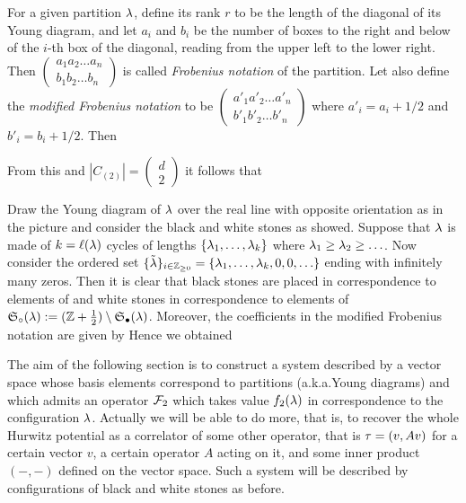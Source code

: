 \documentclass[../main/main.tex]{subfiles}
\begin{document}
For a given partition $\lambda$, define its rank $r$ to be the length of the diagonal of its Young diagram, and let $a_i$ and $b_i$ be the number of boxes to the right and below of the $i$-th box of the diagonal, reading from the upper left to the lower right. Then $\begin{pmatrix}a_1a_2\ldots a_n\\b_1b_2\ldots b_n\end{pmatrix}$ is called \emph{Frobenius notation} of the partition.  Let also define the \emph{modified Frobenius notation} to be $\begin{pmatrix}a'_1a'_2\ldots a'_n\\b'_1b'_2\ldots b'_n\end{pmatrix}$ where $a'_i=a_i+1/2$ and $b'_i=b_i+1/2$. Then
	
\begin{lemma}[{\cite[Ex. 4.17(c)]{FH}}]
\end{lemma}

From this and $|C_{(2)}|=\begin{pmatrix}d\\2\end{pmatrix}$ it follows that 

Draw the Young diagram of $\lambda$ over the real line with opposite orientation as in the picture  and consider the black and white stones as showed. Suppose that $\lambda$ is made of $k=\ell(\lambda)$ cycles of lengths $\{\lambda_1,\ldots,\lambda_k\}$ where $\lambda_1\geq\lambda_2\geq\ldots$. Now consider the ordered set $\{\tilde {\lambda}\}_{i\in\mathbb Z_{\geq0}}=\{\lambda_1,\ldots,\lambda_k,0,0,\ldots\}$ ending with infinitely many zeros. Then it is clear that black stones are placed in correspondence to elements of 
and white stones in correspondence to elements of $\mathfrak S_\circ(\lambda):=(\mathbb Z+\frac12)\setminus\mathfrak S_\bullet(\lambda)$. Moreover, the coefficients in the modified Frobenius notation are given by
Hence we obtained

The aim of the following section is to construct a system described by a vector space whose basis elements correspond to partitions (a.k.a.\@ Young diagrams) and which admits an operator $\mathcal F_2$ which takes value $f_2(\lambda)$ in correspondence to the configuration $\lambda$. Actually we will be able to do more, that is, to recover the whole Hurwitz potential
as a correlator of some other operator, that is $\tau=(v,Av)$ for a certain vector $v$, a certain operator $A$ acting on it, and some inner product $(-,-)$ defined on the vector space. Such a system will be described by configurations of black and white stones as before. 
\end{document}
